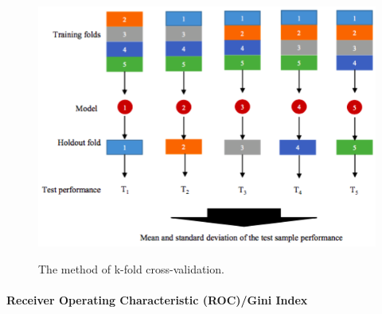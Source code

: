 \documentclass[a4paper, landscape, 6pt, fleqn]{scrartcl}
\begin{document}
\begin{multicols*}{4}
\begin{itemize}
\begin{figure}[H]
\centering
\includegraphics[width=0.9 \linewidth]{kFoldCrossValidation}
\label{fig:kFoldCrossValidation}
\caption{The method of k-fold cross-validation.}
\end{figure}
\end{itemize}

\paragraph{Receiver Operating Characteristic (ROC)/Gini Index}


\end{multicols*}
\end{document}
